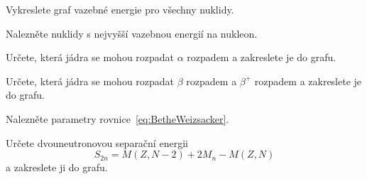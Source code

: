\documentclass[a4paper,12pt,oneside]{article}
\theoremstyle{red}
\begin{document}
    \begin{task}
        Vykreslete graf vazebné energie pro všechny nuklidy.
    \end{task}

    \begin{task}
        Nalezněte nuklidy s nejvyšší vazebnou energií na nukleon.
    \end{task}

    \begin{task}
        Určete, která jádra se mohou rozpadat $\alpha$ rozpadem a zakreslete je do grafu.
    \end{task}

    \begin{task}
        Určete, která jádra se mohou rozpadat $\beta$ rozpadem a $\beta^{+}$ rozpadem a zakreslete je do grafu.
    \end{task}

    \begin{task}
        Nalezněte parametry rovnice~\eqref{eq:BetheWeizsacker}.
    \end{task}

    \begin{task}
        Určete dvouneutronovou separační energii
        \begin{equation}
            S_{2n}=M(Z,N-2)+2M_{n}-M(Z,N)
        \end{equation}
        a zakreslete ji do grafu.
    \end{task}
\end{document}
